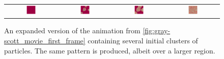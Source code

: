 \begin{figure}[h]
\centering
\mySfFamily
\begin{tabular}{c c c c}
\includegraphics[width = 0.19\textwidth]{../images/f038_100_multi_Moment_1.jpg} & \includegraphics[width = 0.19\textwidth]{../images/f038_100_multi_Moment_2.jpg} & \includegraphics[width = 0.19\textwidth]{../images/f038_100_multi_Moment_3.jpg} & \includegraphics[width = 0.19\textwidth]{../images/f038_100_multi_Moment_4.jpg}
\end{tabular}
\caption{An expanded version of the animation from \autoref{fig:gray-scott_movie_first_frame} containing several initial clusters of  particles. The same pattern is produced, albeit over a larger region.}
\label{fig:gray-scott_multiple_predators_first_frame}
\end{figure}

